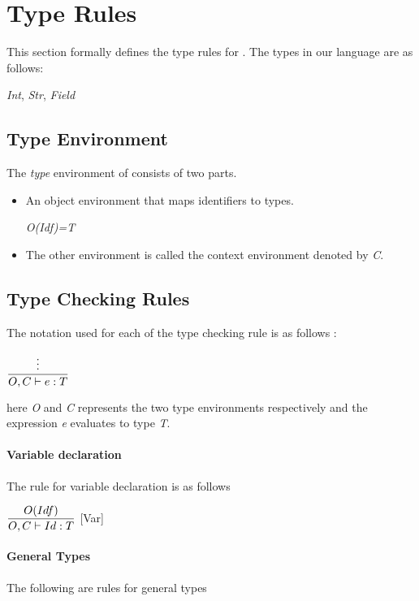 
\section{Type Rules}
This section formally defines the type rules for \langName{}.
The types in our language are as follows:

\textit{Int}, \textit{Str}, \textit{Field}

\subsection{Type Environment}
The \textit{type} environment of \langName{} consists of two parts.
\begin{itemize}
	\item An object environment that maps identifiers to types.\smallskip

	\hspace*{10em}\textit{O(Idf)=T}
	\item The other environment is called the context environment denoted by \textit{C}.
\end{itemize}

\subsection{Type Checking Rules}
The notation used for each of the type checking rule is as follows :

\hspace*{10em} $ \dfrac{\vdots}{O, C \vdash{} e: T}$

here \textit{O} and \textit{C} represents the two type environments respectively and
the expression \textit{e} evaluates to type \textit{T}.

\paragraph{Variable declaration}
The rule for variable declaration is as follows \bigskip

\hspace*{10em} $ \dfrac{O(Idf)}{O, C \vdash{} Id: T}$ [Var]

\paragraph{General Types} The following are rules for general types \bigskip


